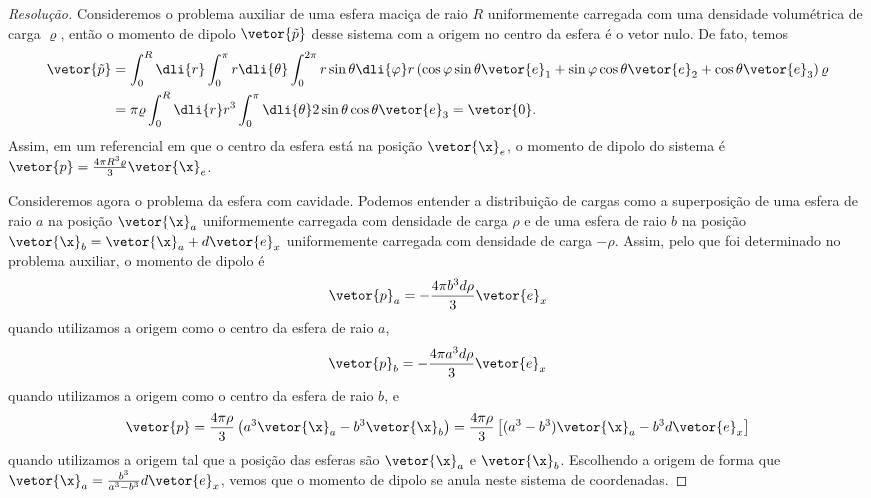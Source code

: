 \begin{proof}[Resolução]
    Consideremos o problema auxiliar de uma esfera maciça de raio \(R\) uniformemente carregada com uma densidade volumétrica de carga \(\varrho\), então o momento de dipolo \(\vetor{\tilde{p}}\) desse sistema com a origem no centro da esfera é o vetor nulo. De fato, temos
    \begin{align*}
        \vetor{\tilde{p}} &= \int_{0}^R \dli{r} \int_{0}^\pi r\dli{\theta} \int_0^{2\pi} r\sin\theta \dli{\varphi} r \left(\cos\varphi \sin\theta \vetor{e}_1 + \sin\varphi\cos\theta \vetor{e}_2 + \cos\theta \vetor{e}_3\right) \varrho\\
                          &= \pi \varrho \int_0^R \dli{r} r^3 \int_0^\pi \dli{\theta} 2\sin\theta \cos\theta \vetor{e}_3 = \vetor{0}.
    \end{align*}
    Assim, em um referencial em que o centro da esfera está na posição \(\vetor{\x}_e\), o momento de dipolo do sistema é \(\vetor{p} = \frac{4\pi R^3 \varrho}{3}\vetor{\x}_e\).

    Consideremos agora o problema da esfera com cavidade. Podemos entender a distribuição de cargas como a superposição de uma esfera de raio \(a\) na posição \(\vetor{\x}_a\) uniformemente carregada com densidade de carga \(\rho\) e de uma esfera de raio \(b\) na posição \(\vetor{\x}_b = \vetor{\x}_a + d\vetor{e}_x\) uniformemente carregada com densidade de carga \(-\rho\). Assim, pelo que foi determinado no problema auxiliar, o momento de dipolo é
    \begin{equation*}
        \vetor{p}_a =-\frac{4\pi b^3d\rho}{3} \vetor{e}_x
    \end{equation*}
    quando utilizamos a origem como o centro da esfera de raio \(a\),
    \begin{equation*}
        \vetor{p}_b = -\frac{4\pi a^3d\rho}{3}\vetor{e}_x
    \end{equation*}
    quando utilizamos a origem como o centro da esfera de raio \(b\), e
    \begin{equation*}
        \vetor{p} = \frac{4\pi\rho}{3}\left(a^3\vetor{\x}_a - b^3\vetor{\x}_b \right) = \frac{4\pi \rho}{3}\left[(a^3 - b^3)\vetor{\x}_a - b^3 d \vetor{e}_x\right]
    \end{equation*}
    quando utilizamos a origem tal que a posição das esferas são \(\vetor{\x}_a\) e \(\vetor{\x}_b\). Escolhendo a origem de forma que \(\vetor{\x}_a = \frac{b^3}{a^3 - b^3} d\vetor{e}_x\), vemos que o momento de dipolo se anula neste sistema de coordenadas.
\end{proof}
